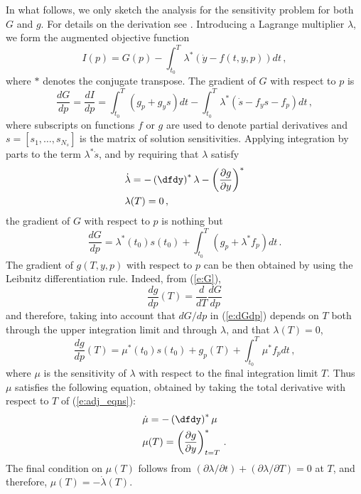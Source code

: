 In what follows, we only sketch the analysis for the 
sensitivity problem for both $G$ and $g$.
For details on the derivation see \cite{CLPS:03}.
Introducing a Lagrange multiplier $\lambda$, we form the augmented
objective function
\begin{equation}
I(p) = G(p) - \int_{t_0}^T \lambda^* 
\left( {\dot y} - f(t,y,p)\right) dt \, ,
\end{equation}
where $*$ denotes the conjugate transpose. The gradient of $G$ with respect
to $p$ is
\begin{equation}
  \frac{dG}{dp} = \frac{dI}{dp} 
=\int_{t_0}^T(g_p + g_y s)dt - \int_{t_0}^T 
\lambda^* \left( {\dot s} - f_y s - f_p \right)dt \, ,
\end{equation}
where subscripts on functions $f$ or $g$ are used to denote partial 
derivatives and $s = [s_1,\ldots,s_{N_s}]$ is the matrix of solution sensitivities.
Applying integration by parts to the term $\lambda^* {\dot s}$, and by requiring
that $\lambda$ satisfy
\begin{equation}\label{e:adj_eqns}
\begin{split}
&{\dot\lambda} = -\left( \dfdy \right)^* \lambda - 
\left( \frac{\partial g}{\partial y} \right)^* \\
&\lambda(T) = 0 \, ,
\end{split}
\end{equation}
the gradient of $G$ with respect to $p$ is nothing but
\begin{equation}\label{e:dGdp}
\frac{dG}{dp} = \lambda^*(t_0) s(t_0) + 
\int_{t_0}^T \left( g_p + \lambda^* f_p \right) dt \, .
\end{equation}
The gradient of $g(T,y,p)$ with respect to $p$ can be then obtained
by using the Leibnitz differentiation rule. Indeed, from (\ref{e:G}),
\begin{equation*}
\frac{dg}{dp}(T) = \frac{d}{dT}\frac{dG}{dp}
\end{equation*}
and therefore, taking into account that $dG/dp$ in (\ref{e:dGdp}) depends on $T$
both through the upper integration limit and through $\lambda$, and that
$\lambda(T) = 0$, 
\begin{equation}\label{e:dgdp}
\frac{dg}{dp}(T) = \mu^*(t_0) s(t_0) + g_p(T) +
\int_{t_0}^T \mu^* f_p dt \, ,
\end{equation}
where $\mu$ is the sensitivity of $\lambda$ with respect to the final integration 
limit $T$.  Thus $\mu$ satisfies the following equation, obtained by taking the
total derivative with respect to $T$ of (\ref{e:adj_eqns}):
\begin{equation}\label{e:adj1_eqns}
\begin{split}
&{\dot\mu} = -\left( \dfdy \right)^* \mu \\ 
&\mu(T) = \left( \frac{\partial g}{\partial y} \right)^*_{t=T} \, .
\end{split}
\end{equation}
The final condition on $\mu(T)$ follows from 
$(\partial\lambda/\partial t) + (\partial\lambda/\partial T) = 0$ at $T$, and
therefore, $\mu(T) = -{\dot\lambda}(T)$. 

